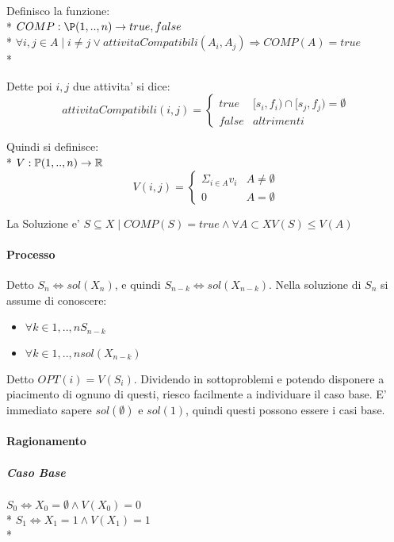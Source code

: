 Definisco la funzione: \\*
$COMP : \P({1,..,n}) \rightarrow {true, false}$ \\*
$\forall i,j \in A \mid i \ne j \lor attivitaCompatibili(A_i,A_j) \Rightarrow COMP(A) = true$ \\*

Dette poi $i,j$ due attivita' si dice:
\[
    attivitaCompatibili(i,j) =
    \begin{cases}
        \text{$true$} & \text{$[s_i, f_i) \cap [s_j, f_j) = \emptyset$} \\
        \text{$false$} & altrimenti
    \end{cases}
\]

Quindi si definisce: \\*
$V : \mathbb{P}({1,..,n}) \rightarrow \mathbb{R}$
\[
    V(i,j) =
    \begin{cases}
        \text{$\Sigma _ {i \in A} v_i$} & \text{$A \ne \emptyset$} \\
        \text{$0$} & \text{$A = \emptyset$}
    \end{cases}
\]

La Soluzione e' $S \subseteq X \mid COMP(S) = true \land \forall A \subset X V(S) \leq V(A)$

\paragraph{Processo}

Detto $S_n \Leftrightarrow sol(X_n)$, e quindi $S_{n-k} \Leftrightarrow sol(X_{n-k})$.
Nella soluzione di $S_n$ si assume di conoscere:

\begin{itemize}
    \item $\forall k \in {1,..,n} S_{n-k}$
    \item $\forall k \in {1,..,n} sol(X_{n-k})$
\end{itemize}

Detto $OPT(i) = V(S_i)$.
Dividendo in sottoproblemi e potendo disponere a piacimento di ognuno di questi, riesco facilmente a individuare il caso base.
E' immediato sapere $sol(\emptyset)$ e $sol({1})$, quindi questi possono essere i casi base.

\paragraph{Ragionamento}

\subparagraph{Caso Base}

$S_0  \Leftrightarrow X_0 = \emptyset \land V(X_0) = 0$ \\*
$S_1  \Leftrightarrow X_1 = {1} \land V(X_1) = 1$ \\*

